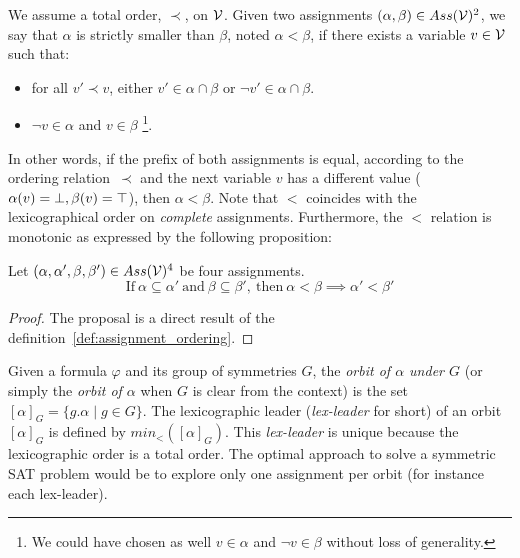 \begin{definition}\label{def:assignment_ordering}%
 We assume a total order, $\prec$, on $\mathcal{V}$.  Given two assignments $(\alpha,\beta) \in Ass(\mathcal{V})^2 $,%
 we say that $\alpha$ is strictly smaller than $\beta$, noted $\alpha < \beta$, if there exists a variable $v \in \mathcal{V}$%
 such that:%
 \begin{itemize}%
  \item for all $v' \prec v$, either $v' \in \alpha \cap \beta$ or $\neg v' \in \alpha \cap \beta$.%
  \item $\neg v \in \alpha$ and $v \in \beta$ \footnote{We could have chosen as well $v \in \alpha$ and $\neg v \in \beta$ without loss of generality.}.%
 \end{itemize}%
\end{definition}
In other words, if the prefix of both assignments is equal, according to the ordering relation~$\prec$
and the next variable $v$ has a different value ($\alpha(v) = \bot, \beta(v) = \top$), then $\alpha < \beta$.
Note that $<$ coincides with the lexicographical order on \emph{complete}
assignments. 
Furthermore, the $<$ relation is monotonic as expressed by the following proposition:
\begin{proposition}
 \label{prop:monocity_assignments_ordering}
 Let  $(\alpha,\alpha',\beta,\beta') \in Ass(\mathcal{V})^4 $ be four assignments.
 $$\text{If}~\alpha \subseteq \alpha'~\text{and}~\beta \subseteq \beta',~\text{then}~\alpha < \beta \implies \alpha' < \beta'$$
\end{proposition}
\begin{proof}
The proposal is a direct result of the definition~\ref{def:assignment_ordering}.
\end{proof}
Given a formula $\varphi$ and its group of symmetries $G$,
the \emph{orbit of $\alpha$ under $G$} (or
simply the \emph{orbit of $\alpha$} when $G$ is clear from the context) is the set
$ [\alpha]_G=\{ g.\alpha \mid g \in G \}$. 
The lexicographic leader (\textit{lex-leader} for short) of an orbit $[\alpha]_G$ is defined by
$min_<([\alpha]_G)$. This \textit{lex-leader} is unique because the lexicographic
order is a total order.
The optimal approach to solve a symmetric SAT problem would be to explore
only one assignment per orbit (for instance each lex-leader).
% 

